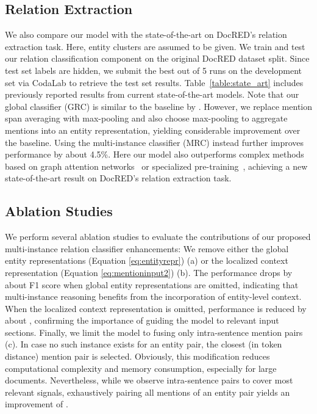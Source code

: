 \documentclass[11pt,a4paper]{article}
\begin{document}
\subsection{Relation Extraction}
We also compare our model with the state-of-the-art on DocRED's relation extraction task. Here, entity clusters are assumed to be given. We train and test our relation classification component on the original DocRED dataset split. Since test set labels are hidden, we submit the best out of 5 runs on the development set via CodaLab to retrieve the test set results. Table~\ref{table:state_art} includes previously reported results from current state-of-the-art models. Note that our global classifier (GRC) is similar to the baseline by \cite{yao:2019:docred}. However, we replace mention span averaging with max-pooling and also choose max-pooling to aggregate mentions into an entity representation, yielding considerable improvement over the baseline. Using the multi-instance classifier (MRC) instead further improves performance by about 4.5\%. Here our model also outperforms complex methods based on graph attention networks~\cite{nan:2020:bert_lsr} or specialized pre-training~\cite{ye:2020:coref_bert}, achieving a new state-of-the-art result on DocRED's relation extraction task.

\subsection{Ablation Studies}

We perform several ablation studies to evaluate the contributions of our proposed multi-instance relation classifier enhancements: We remove either the global entity representations  (Equation \ref{eq:entityrepr}) (a) or the localized context representation  (Equation \ref{eq:mentioninput2}) (b). The performance drops by about  F1 score when global entity representations are omitted, indicating that multi-instance reasoning benefits from the incorporation of entity-level context. When the localized context representation is omitted, performance is reduced by about , confirming the importance of guiding the model to relevant input sections. Finally, we limit the model to fusing only intra-sentence mention pairs (c). In case no such instance exists for an entity pair, the closest (in token distance) mention pair is selected. Obviously, this modification reduces computational complexity and memory consumption, especially for large documents. Nevertheless, while we observe intra-sentence pairs to cover most relevant signals, exhaustively pairing all mentions of an entity pair yields an improvement of . 
\end{document}
